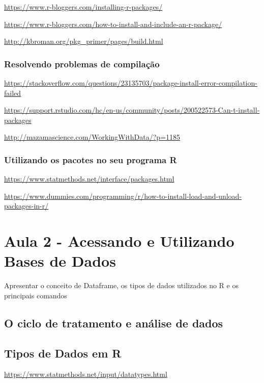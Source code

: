 \documentclass[12pt,a4paper,oneside]{erdc}
\begin{document}
\url{https://www.r-bloggers.com/installing-r-packages/}

\url{https://www.r-bloggers.com/how-to-install-and-include-an-r-package/}

\url{http://kbroman.org/pkg_primer/pages/build.html}


\subsection{Resolvendo problemas de compilação}

\url{https://stackoverflow.com/questions/23135703/package-install-error-compilation-failed}

\url{https://support.rstudio.com/hc/en-us/community/posts/200522573-Can-t-install-packages}

\url{http://mazamascience.com/WorkingWithData/?p=1185}


\subsection{Utilizando os pacotes no seu programa R}

\url{https://www.statmethods.net/interface/packages.html}

\url{https://www.dummies.com/programming/r/how-to-install-load-and-unload-packages-in-r/}






%
%
		
\chapter{Aula 2 - Acessando e Utilizando Bases de Dados}

Apresentar o conceito de Dataframe, os tipos de dados utilizados no R e os principais comandos  

\section{O ciclo de tratamento e análise de dados}

\section{Tipos de Dados em R}

\url{https://www.statmethods.net/input/datatypes.html}
\end{document}
